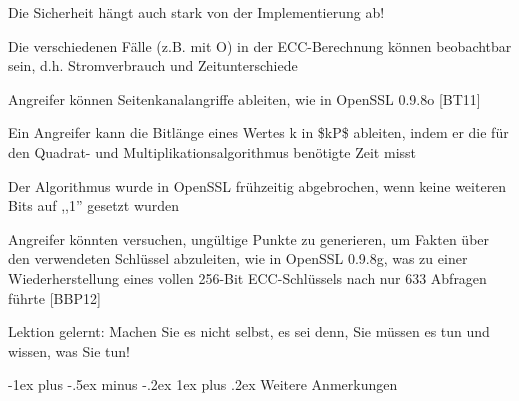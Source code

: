 \documentclass[a4paper]{article}
\makeatletter
\renewcommand{\subsubsection}{\@startsection{subsubsection}{3}{0mm}%
 {-1ex plus -.5ex minus -.2ex}%
 {1ex plus .2ex}%
 {\normalfont\small\bfseries}}
\makeatother
\begin{document}
\begin{multicols}{3}
\begin{itemize*}
            \item Die Sicherheit hängt auch stark von der Implementierung ab!
            \begin{itemize*}
                  \item Die verschiedenen Fälle (z.B. mit O) in der ECC-Berechnung können beobachtbar sein, d.h. Stromverbrauch und Zeitunterschiede
                  \item Angreifer können Seitenkanalangriffe ableiten, wie in OpenSSL 0.9.8o {[}BT11{]}
                  \begin{itemize*} \item Ein Angreifer kann die Bitlänge eines Wertes k in \$kP\$ ableiten, indem er die für den Quadrat- und Multiplikationsalgorithmus benötigte Zeit misst \item Der Algorithmus wurde in OpenSSL frühzeitig abgebrochen, wenn keine weiteren Bits auf ,,1'' gesetzt wurden \end{itemize*}
                  \item Angreifer könnten versuchen, ungültige Punkte zu generieren, um Fakten über den verwendeten Schlüssel abzuleiten, wie in OpenSSL 0.9.8g, was zu einer Wiederherstellung eines vollen 256-Bit ECC-Schlüssels nach nur 633 Abfragen führte {[}BBP12{]}
            \end{itemize*}
            \item Lektion gelernt: Machen Sie es nicht selbst, es sei denn, Sie müssen
            es tun und wissen, was Sie tun!
      \end{itemize*}


      \subsubsection{Weitere Anmerkungen}


\end{multicols}
\end{document}
